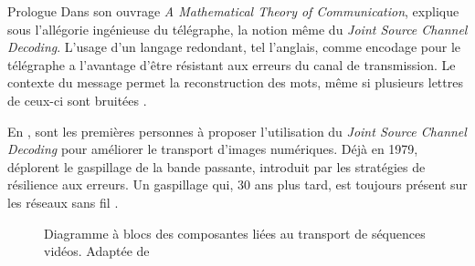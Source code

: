 \begin{section}{Prologue}
\label{sect-prologue}
Dans son ouvrage \textit{A Mathematical Theory of Communication},
\citet{Shannon1948} explique sous l'allégorie ingénieuse du télégraphe, la
notion même du \textit{Joint Source Channel Decoding}. L'usage d'un langage
redondant, tel l'anglais, comme encodage pour le télégraphe a l'avantage d'être
résistant aux erreurs du canal de transmission. Le contexte du message permet
la reconstruction des mots, même si plusieurs lettres de ceux-ci sont bruitées
\citep[p.~24]{Shannon1948}.

En \citeyear{Modestino1979}, \citeauthor{Modestino1979} sont les premières
personnes à proposer l'utilisation du \textit{Joint Source Channel Decoding}
pour améliorer le transport d'images numériques. Déjà en 1979,
\citeauthor{Modestino1979} déplorent le gaspillage de la bande passante,
introduit par les stratégies de résilience aux erreurs. Un gaspillage qui, 30
ans plus tard, est toujours présent sur les réseaux sans fil
\citep[p.1]{Duhamel2010}.

\begin{figure}
	\caption[Composantes liées au transport de séquences vidéos]{Diagramme à blocs
des composantes liées au transport de séquences vidéos. Adaptée de
\citet[p.~976]{Wang1998}}
	\label{fig-VideoCommunication}
\end{figure}


\end{section}
